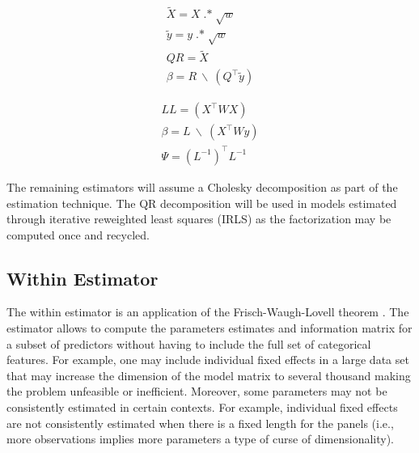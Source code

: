 \documentclass{juliacon}
\DeclareMathOperator{\HadamardProduct}{.*}
\begin{document}
\begin{equation}
\label{QR}
\begin{split}
	\tilde{X} = X \HadamardProduct \sqrt{w} \\
	\tilde{y} = y \HadamardProduct \sqrt{w} \\
	QR = \tilde{X} \\
	\beta = R \ \backslash \ \left( Q^{\top} \tilde{y} \right)
\end{split}
\end{equation}

\begin{equation}
\label{Cholesky}
\begin{split}
	LL = \left( X^{\top} W X \right) \\
	\beta = L \ \backslash \ \left( X^{\top} W y \right) \\
	\Psi = \left( L^{-1}\right)^{\top} L^{-1}
\end{split}
\end{equation}

The remaining estimators will assume a Cholesky decomposition as part of the estimation technique. The QR decomposition will be used in models estimated through iterative reweighted least squares (IRLS) as the factorization may be computed once and recycled.

\subsection{Within Estimator}

The within estimator is an application of the Frisch-Waugh-Lovell theorem \cite{FWL, FWLProof}. The estimator allows to compute the parameters estimates and information matrix for a subset of predictors without having to include the full set of categorical features. For example, one may include individual fixed effects in a large data set that may increase the dimension of the model matrix to several thousand making the problem unfeasible or inefficient. Moreover, some parameters may not be consistently estimated in certain contexts. For example, individual fixed effects are not consistently estimated when there is a fixed length for the panels (i.e., more observations implies more parameters a type of curse of dimensionality).
\end{document}
